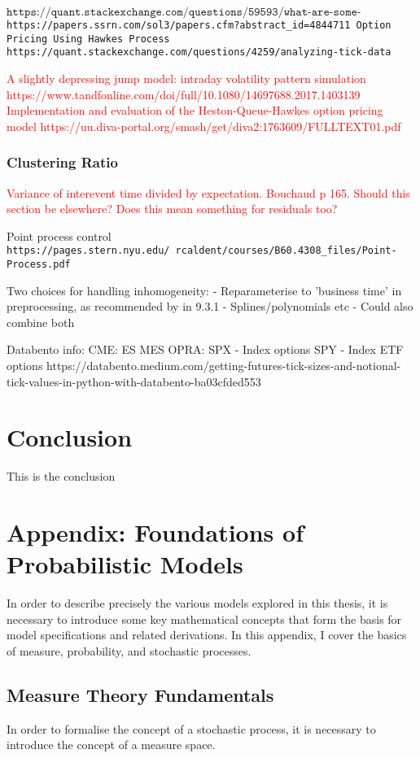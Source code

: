 \documentclass[honours,12pt]{unswthesis}
\numberwithin{equation}{section}
\begin{document}
$\texttt{https://quant.stackexchange.com/questions/59593/what-are-some-currently-open-problems-in-market-microstructure}$
\texttt{https://papers.ssrn.com/sol3/papers.cfm?abstract_id=4844711 Option Pricing Using Hawkes Process}
\texttt{https://quant.stackexchange.com/questions/4259/analyzing-tick-data}

\textcolor{red}{A slightly depressing jump model: intraday volatility pattern simulation https://www.tandfonline.com/doi/full/10.1080/14697688.2017.1403139}
\textcolor{red}{Implementation and evaluation of the Heston-Queue-Hawkes option pricing model https://uu.diva-portal.org/smash/get/diva2:1763609/FULLTEXT01.pdf}

\subsection{Clustering Ratio}
\textcolor{red}{Variance of interevent time divided by expectation. Bouchaud p 165. Should this section be elsewhere? Does this mean something for residuals too?}

Point process control \texttt{https://pages.stern.nyu.edu/~rcaldent/courses/B60.4308_files/Point-Process.pdf}

Two choices for handling inhomogeneity:
- Reparameterise to 'business time' in preprocessing, as recommended by \cite{BouchaudEtAl} in 9.3.1
- Splines/polynomials etc
- Could also combine both


Databento info:
CME:
ES
MES
OPRA:
SPX - Index options
SPY - Index ETF options
https://databento.medium.com/getting-futures-tick-sizes-and-notional-tick-values-in-python-with-databento-ba03cfded553

\chapter{Conclusion}\label{ccl}


This is the conclusion


\chapter{Appendix: Foundations of Probabilistic Models}
In order to describe precisely the various models explored in this thesis, it is necessary to introduce some key mathematical concepts that form the basis for model specifications and related derivations. In this appendix, I cover the basics of measure, probability, and stochastic processes.

\section{Measure Theory Fundamentals}
In order to formalise the concept of a stochastic process, it is necessary to introduce the concept of a measure space.
\end{document}
